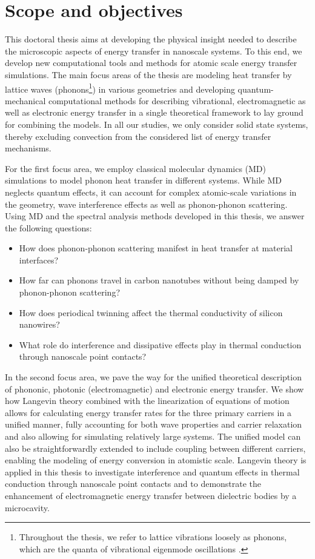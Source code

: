 \section{Scope and objectives}

This doctoral thesis aims at developing the physical insight needed to describe the microscopic aspects of energy transfer in nanoscale systems. To this end, we develop new computational tools and methods for atomic scale energy transfer simulations. The main focus areas of the thesis are modeling heat transfer by lattice waves (phonons\footnote{Throughout the thesis, we refer to lattice vibrations loosely as phonons, which are the quanta of vibrational eigenmode oscillations \cite{ziman}.}) in various geometries and developing quantum-mechanical computational methods for describing vibrational, electromagnetic as well as electronic energy transfer in a single theoretical framework to lay ground for combining the models. In all our studies, we only consider solid state systems, thereby excluding convection \cite{chen} from the considered list of energy transfer mechanisms. 

For the first focus area, we employ classical molecular dynamics (MD) simulations to model phonon heat transfer in different systems. While MD neglects quantum effects, it can account for complex atomic-scale variations in the geometry, wave interference effects as well as phonon-phonon scattering. Using MD and the spectral analysis methods developed in this thesis, we answer the following questions: 
 \begin{itemize}
  \item How does phonon-phonon scattering manifest in heat transfer at material interfaces?
  \item How far can phonons travel in carbon nanotubes without being damped by phonon-phonon scattering?
  \item How does periodical twinning affect the thermal conductivity of silicon nanowires?
  \item What role do interference and dissipative effects play in thermal conduction through nanoscale point contacts?
 \end{itemize}

In the second focus area, we pave the way for the unified theoretical description of phononic, photonic (electromagnetic) and electronic energy transfer. We show how Langevin theory \cite{langevin08,zwanzig} combined with the linearization of equations of motion allows for calculating energy transfer rates for the three primary carriers in a unified manner, fully accounting for both wave properties and carrier relaxation and also allowing for simulating relatively large systems. The unified model can also be straightforwardly extended to include coupling between different carriers, enabling the modeling of energy conversion in atomistic scale. Langevin theory is applied in this thesis to investigate interference and quantum effects in thermal conduction through nanoscale point contacts and to demonstrate the enhancement of electromagnetic energy transfer between dielectric bodies by a microcavity.


